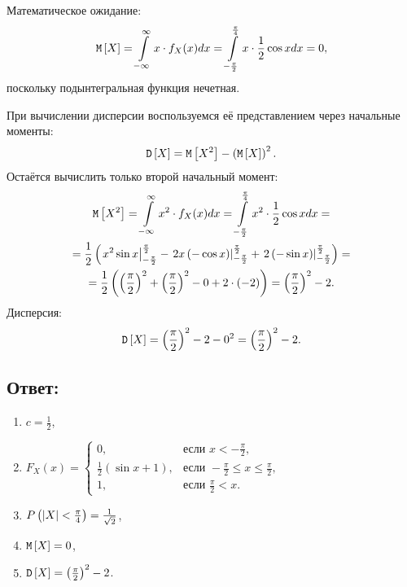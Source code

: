 Математическое ожидание:
\begin{equation}
    \mathtt{M} \left [ X \right ]
    = \int \limits_{-\infty}^{\infty} x \cdot f_X(x) dx
    = \int \limits_{-\frac{\pi}{2}}^{\frac{\pi}{4}} x \cdot \frac{1}{2} \cos x dx
    = 0,
\end{equation}
поскольку подынтегральная функция нечетная.

При вычислении дисперсии воспользуемся её представлением через начальные моменты:
\begin{equation}
    \mathtt{D} \left [ X \right ] = \mathtt{M} \left [ X^2 \right ] - \left ( \mathtt{M} \left [ X \right ] \right )^2 .
\end{equation}
Остаётся вычислить только второй начальный момент:
\begin{multline}
    \mathtt{M} \left [ X^2 \right ]
    = \int \limits_{-\infty}^{\infty} x^2 \cdot f_X(x) dx
    = \int \limits_{-\frac{\pi}{2}}^{\frac{\pi}{4}} x^2 \cdot \frac{1}{2} \cos x dx = \\
    = \frac{1}{2} \left (
    \left . x^2 \sin x \right |_{-\frac{\pi}{2}}^{\frac{\pi}{2}}
    - \left . 2 x \left ( - \cos x \right )\right |_{-\frac{\pi}{2}}^{\frac{\pi}{2}}
    + \left . 2 \left ( - \sin x \right )\right |_{-\frac{\pi}{2}}^{\frac{\pi}{2}}
    \right )
    = \\
    = \frac{1}{2} \left (
    \left ( \frac{\pi}{2} \right )^2 +  \left ( \frac{\pi}{2} \right )^2
    - 0
    + 2 \cdot ( - 2 )
    \right )
    = \left ( \frac{\pi}{2} \right )^2 - 2.
\end{multline}
Дисперсия:
\begin{equation}
    \mathtt{D} \left [ X \right ]
    = \left ( \frac{\pi}{2} \right )^2 - 2 - 0^2
    = \left ( \frac{\pi}{2} \right )^2 - 2.
\end{equation}

\subsection*{Ответ:}
\begin{enumerate}
    \item $c = \frac{1}{2}$,
    \item $F_X(x)
    = \left \{
    \begin{array}{ll}
        0,                                       & \text{если } x < - \frac{\pi}{2},                    \\
        \frac{1}{2} \left ( \sin x + 1 \right ), & \text{если } -\frac{\pi}{2} \le x \le \frac{\pi}{2}, \\
        1,                                       & \text{если } \frac{\pi}{2} < x .
    \end{array}
    \right .
    $
    \item $P \left ( \left | X \right | < \frac{\pi}{4} \right ) = \frac{1}{\sqrt{2}}$,
    \item $\mathtt{M} \left [ X \right ] = 0$,
    \item $\mathtt{D} \left [ X \right ] = \left ( \frac{\pi}{2} \right )^2 - 2$.
\end{enumerate}

